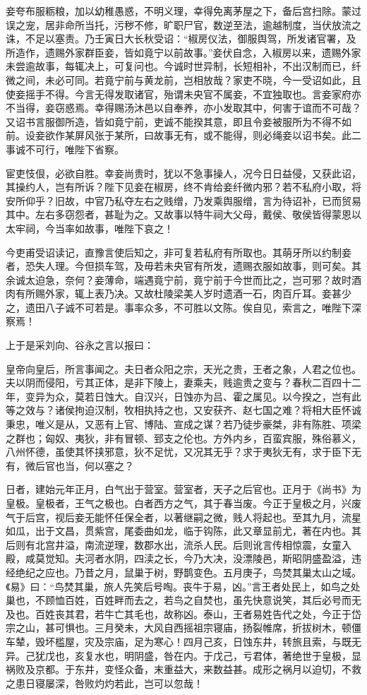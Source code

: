 \documentclass[]{article}
\begin{document}
妾夸布服粝粮，加以幼稚愚惑，不明义理，幸得免离茅屋之下，备后宫扫除。蒙过误之宠，居非命所当托，污秽不修，旷职尸官，数逆至法，逾越制度，当伏放流之诛，不足以塞责。乃壬寅日大长秋受诏：``椒房仪法，御服舆驾，所发诸官署，及所造作，遗赐外家群臣妾，皆如竟宁以前故事。''妾伏自念，入椒房以来，遗赐外家未尝逾故事，每辄决上，可复问也。今诚时世异制，长短相补，不出汉制而已，纤微之间，未必可同。若竟宁前与黄龙前，岂相放哉？家吏不晓，今一受诏如此，且使妾摇手不得。今言无得发取诸官，殆谓未央官不属妾，不宜独取也。言妾家府亦不当得，妾窃惑焉。幸得赐汤沐邑以自奉养，亦小发取其中，何害于谊而不可哉？又诏书言服御所造，皆如竟宁前，吏诚不能揆其意，即且令妾被服所为不得不如前。设妾欲作某屏风张于某所，曰故事无有，或不能得，则必绳妾以诏书矣。此二事诚不可行，唯陛下省察。

宦吏忮佷，必欲自胜。幸妾尚贵时，犹以不急事操人，况今日日益侵，又获此诏，其操约人，岂有所诉？陛下见妾在椒房，终不肯给妾纤微内邪？若不私府小取，将安所仰乎？旧故，中官乃私夺左右之贱缯，乃发乘舆服缯，言为待诏补，已而贸易其中。左右多窃怨者，甚耻为之。又故事以特牛祠大父母，戴侯、敬侯皆得蒙恩以太牢祠，今当率如故事，唯陛下哀之！

今吏甫受诏读记，直豫言使后知之，非可复若私府有所取也。其萌牙所以约制妾者，恐失人理。今但损车驾，及毋若未央官有所发，遗赐衣服如故事，则可矣。其余诚太迫急，奈何？妾薄命，端遇竟宁前，竟宁前于今世而比之，岂可邪？故时酒肉有所赐外家，辄上表乃决。又故杜陵梁美人岁时遗酒一石，肉百斤耳。妾甚少之，遗田八子诚不可若是。事率众多，不可胜以文陈。俟自见，索言之，唯陛下深察焉！

上于是采刘向、谷永之言以报曰：

皇帝向皇后，所言事闻之。夫日者众阳之宗，天光之贵，王者之象，人君之位也。夫以阴而侵阳，亏其正体，是非下陵上，妻乘夫，贱逾贵之变与？春秋二百四十二年，变异为众，莫若日蚀大。自汉兴，日蚀亦为吕、霍之属见。以今揆之，岂有此等之效与？诸侯拘迫汉制，牧相执持之也，又安获齐、赵七国之难？将相大臣怀诚秉忠，唯义是从，又恶有上官、博陆、宣成之谋？若乃徒步豪桀，非有陈胜、项梁之群也；匈奴、夷狄，非有冒顿、郅支之伦也。方外内乡，百蛮宾服，殊俗慕义，八州怀德，虽使其怀挟邪意，狄不足忧，又况其无乎？求于夷狄无有，求于臣下无有，微后官也当，何以塞之？

日者，建始元年正月，白气出于营室。营室者，天子之后官也。正月于《尚书》为皇极。皇极者，王气之极也。白者西方之气，其于春当废。今正于皇极之月，兴废气于后宫，视后妾无能怀任保全者，以著继嗣之微，贱人将起也。至其九月，流星如瓜，出于文昌，贯紫宫，尾委曲如龙，临于钩陈，此又章显前尤，著在内也。其后则有北宫井溢，南流逆理，数郡水出，流杀人民。后则讹言传相惊震，女童入殿，咸莫觉知。夫河者水阴，四渎之长，今乃大决，没漂陵邑，斯昭阴盛盈溢，违经绝纪之应也。乃昔之月，鼠巢于树，野鹊变色。五月庚子，鸟焚其巢太山之域。《易》曰：``鸟焚其巢，旅人先笑后号啕。丧牛于易，凶。''言王者处民上，如鸟之处巢也，不顾恤百姓，百姓畔而去之，若鸟之自焚也，虽先快意说笑，其后必号而无及也。百姓丧其君，若牛亡其毛也，故称凶。泰山，王者易姓告代之处，今正于岱宗之山，甚可惧也。三月癸未，大风自西摇祖宗寝庙，扬裂帷席，折拔树木，顿僵车辇，毁坏槛屋，灾及宗庙，足为寒心！四月己亥，日蚀东井，转旅且索，与既无异。己犹戊也，亥复水也，明阴盛，咎在内。于戊己，亏君体，著绝世于皇极，显祸败及京都。于东井，变怪众备，末重益大，来数益甚。成形之祸月以迫切，不救之患日寝屡深，咎败灼灼若此，岂可以忽哉！
\end{document}
